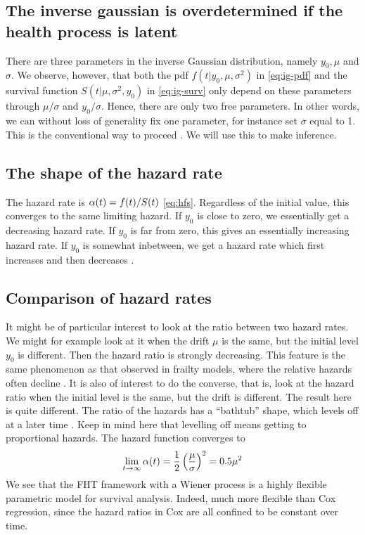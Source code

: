 \subsection{The inverse gaussian is overdetermined if the health process is latent}
There are three parameters in the inverse Gaussian distribution, namely $y_0, \mu$ and $\sigma$. We observe, however, that both the pdf $f(t|y_0,\mu,\sigma^2)$ in \eqref{eq:ig-pdf} and the survival function $S(t|\mu,\sigma^2,y_0)$ in \eqref{eq:ig-surv} only depend on these parameters through $\mu/\sigma$ and $y_0/\sigma$. Hence, there are only two free parameters. In other words, we can without loss of generality fix one parameter, for instance set $\sigma$ equal to 1. This is the conventional way to proceed \citep{leewhitmore2006}. We will use this to make inference.

\subsection{The shape of the hazard rate}
The hazard rate is $\alpha(t)=f(t)/S(t)$ \eqref{eq:hfs}. Regardless of the initial value, this converges to the same limiting hazard. If $y_0$ is close to zero, we essentially get a decreasing hazard rate. If $y_0$ is far from zero, this gives an essentially increasing hazard rate. If $y_0$ is somewhat inbetween, we get a hazard rate which first increases and then decreases \citep{ABG}.

\subsection{Comparison of hazard rates}
It might be of particular interest to look at the ratio between two hazard rates. We might for example look at it when the drift $\mu$ is the same, but the initial level $y_0$ is different. Then the hazard ratio is strongly decreasing. This feature is the same phenomenon as that observed in frailty models, where the relative hazards often decline \citep{ABG}.
It is also of interest to do the converse, that is, look at the hazard ratio when the initial level is the same, but the drift is different. The result here is quite different. The ratio of the hazards has a ``bathtub'' shape, which levels off at a later time \citep{ABG}. Keep in mind here that levelling off means getting to proportional hazards. The hazard function converges to
\begin{equation}
    \lim_{t\to\infty}\alpha(t)=\frac{1}{2}\left(\frac{\mu}{\sigma}\right)^2=0.5\mu^2
\end{equation}
We see that the FHT framework with a Wiener process is a highly flexible parametric model for survival analysis. Indeed, much more flexible than Cox regression, since the hazard ratios in Cox are all confined to be constant over time.

